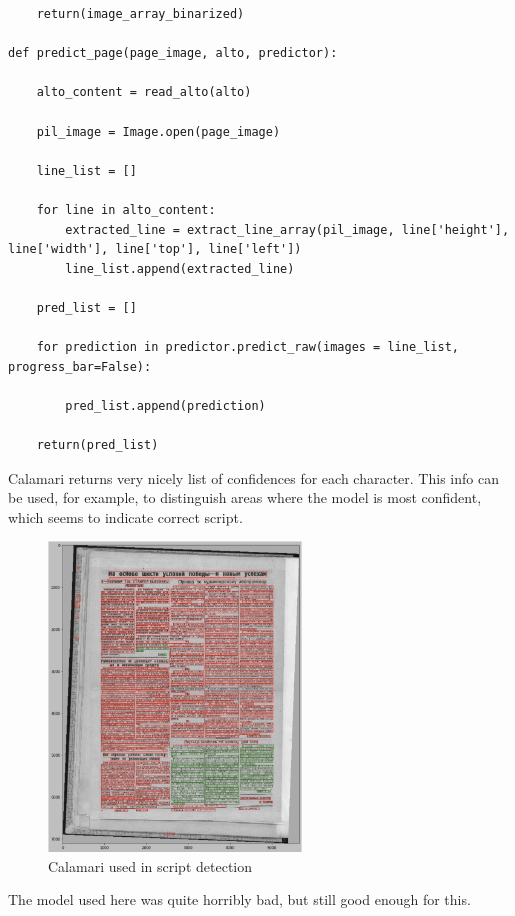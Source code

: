 \documentclass[]{book}
\begin{document}
\begin{verbatim}
    return(image_array_binarized)

def predict_page(page_image, alto, predictor):
    
    alto_content = read_alto(alto)
    
    pil_image = Image.open(page_image)
    
    line_list = []

    for line in alto_content:
        extracted_line = extract_line_array(pil_image, line['height'], line['width'], line['top'], line['left'])
        line_list.append(extracted_line)
    
    pred_list = []
    
    for prediction in predictor.predict_raw(images = line_list, progress_bar=False):

        pred_list.append(prediction)
        
    return(pred_list)
\end{verbatim}

Calamari returns very nicely list of confidences for each character. This info can be used, for example, to distinguish areas where the model is most confident, which seems to indicate correct script.

\begin{figure}
\centering
\includegraphics[width=0.6\textwidth,height=\textheight]{images/calamari_script_detector.jpg}
\caption{Calamari used in script detection}
\end{figure}

The model used here was quite horribly bad, but still good enough for this.


\end{document}
